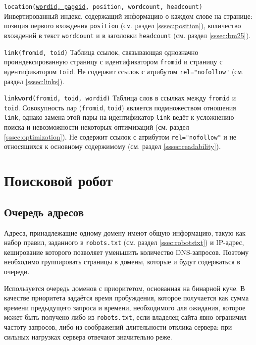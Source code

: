 \begin{definition}{\texttt{location(\underline{wordid, pageid}, position, wordcount, headcount)}}
  Инвертированный индекс, содержащий информацию о каждом слове на странице: позиция первого вхождения \verb|position| (см. раздел \ref{sssec:position}), количество вхождений в текст \verb|wordcount| и в заголовки \verb|headcount| (см. раздел \ref{sssec:bm25}).
\end{definition}

\begin{definition}{\texttt{link(fromid, toid)}}
  Таблица ссылок, связывающая однозначно проиндексированную страницу с идентификатором \verb|fromid| и страницу с идентификатором \verb|toid|. Не содержит ссылок с атрибутом \verb|rel="nofollow"| (см. раздел \ref{sssec:links}).
\end{definition}

\begin{definition}{\texttt{linkword(fromid, toid, wordid)}}
  Таблица слов в ссылках между \verb|fromid| и \verb|toid|. Совокупность пар (\verb|fromid|, \verb|toid|) является подмножеством отношения \verb|link|, однако замена этой пары на идентификатор \verb|link| ведёт к усложнению поиска и невозможности некоторых оптимизаций (см. раздел \ref{sssec:optimization}). Не содержит ссылок с атрибутом \verb|rel="nofollow"| и не относящихся к основному содержимому (см. раздел \ref{sssec:readability}).
\end{definition}


\section{Поисковой робот}
\subsection{Очередь адресов}
Адреса, принадлежащие одному домену имеют общую информацию, такую как набор правил, заданного в \verb|robots.txt| (см. раздел \ref{ssec:robotstxt}) и IP-адрес, кеширование которого позволяет уменьшить количество DNS-запросов. Поэтому необходимо группировать страницы в домены, которые и будут содержаться в очереди.

Используется очередь доменов с приоритетом, основанная на бинарной куче. В качестве приоритета задаётся время пробуждения, которое получается как сумма времени предыдущего запроса и времени, необходимого для ожидания, которое может быть получено либо из \verb|robots.txt|, если владелец сайта явно ограничил частоту запросов, либо из соображений длительности отклика сервера: при сильных нагрузках сервера отвечают значительно реже.

